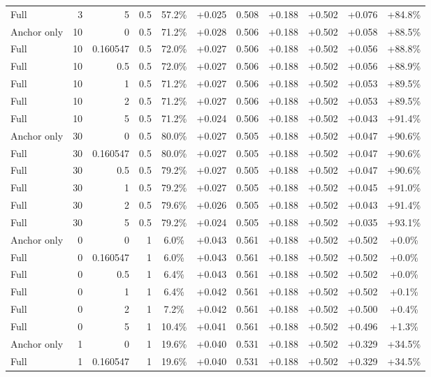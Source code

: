 \begin{table}[htbp]
\begin{tabular}{lrrrccccccc}
Full & 3 & 5 & 0.5 & 57.2\% & +0.025 & 0.508 & +0.188 & +0.502 & +0.076 & +84.8\% \\
Anchor only & 10 & 0 & 0.5 & 71.2\% & +0.028 & 0.506 & +0.188 & +0.502 & +0.058 & +88.5\% \\
Full & 10 & 0.160547 & 0.5 & 72.0\% & +0.027 & 0.506 & +0.188 & +0.502 & +0.056 & +88.8\% \\
Full & 10 & 0.5 & 0.5 & 72.0\% & +0.027 & 0.506 & +0.188 & +0.502 & +0.056 & +88.9\% \\
Full & 10 & 1 & 0.5 & 71.2\% & +0.027 & 0.506 & +0.188 & +0.502 & +0.053 & +89.5\% \\
Full & 10 & 2 & 0.5 & 71.2\% & +0.027 & 0.506 & +0.188 & +0.502 & +0.053 & +89.5\% \\
Full & 10 & 5 & 0.5 & 71.2\% & +0.024 & 0.506 & +0.188 & +0.502 & +0.043 & +91.4\% \\
Anchor only & 30 & 0 & 0.5 & 80.0\% & +0.027 & 0.505 & +0.188 & +0.502 & +0.047 & +90.6\% \\
Full & 30 & 0.160547 & 0.5 & 80.0\% & +0.027 & 0.505 & +0.188 & +0.502 & +0.047 & +90.6\% \\
Full & 30 & 0.5 & 0.5 & 79.2\% & +0.027 & 0.505 & +0.188 & +0.502 & +0.047 & +90.6\% \\
Full & 30 & 1 & 0.5 & 79.2\% & +0.027 & 0.505 & +0.188 & +0.502 & +0.045 & +91.0\% \\
Full & 30 & 2 & 0.5 & 79.6\% & +0.026 & 0.505 & +0.188 & +0.502 & +0.043 & +91.4\% \\
Full & 30 & 5 & 0.5 & 79.2\% & +0.024 & 0.505 & +0.188 & +0.502 & +0.035 & +93.1\% \\
Anchor only & 0 & 0 & 1 & 6.0\% & +0.043 & 0.561 & +0.188 & +0.502 & +0.502 & +0.0\% \\
Full & 0 & 0.160547 & 1 & 6.0\% & +0.043 & 0.561 & +0.188 & +0.502 & +0.502 & +0.0\% \\
Full & 0 & 0.5 & 1 & 6.4\% & +0.043 & 0.561 & +0.188 & +0.502 & +0.502 & +0.0\% \\
Full & 0 & 1 & 1 & 6.4\% & +0.042 & 0.561 & +0.188 & +0.502 & +0.502 & +0.1\% \\
Full & 0 & 2 & 1 & 7.2\% & +0.042 & 0.561 & +0.188 & +0.502 & +0.500 & +0.4\% \\
Full & 0 & 5 & 1 & 10.4\% & +0.041 & 0.561 & +0.188 & +0.502 & +0.496 & +1.3\% \\
Anchor only & 1 & 0 & 1 & 19.6\% & +0.040 & 0.531 & +0.188 & +0.502 & +0.329 & +34.5\% \\
Full & 1 & 0.160547 & 1 & 19.6\% & +0.040 & 0.531 & +0.188 & +0.502 & +0.329 & +34.5\% \\

\end{tabular}
\end{table}
